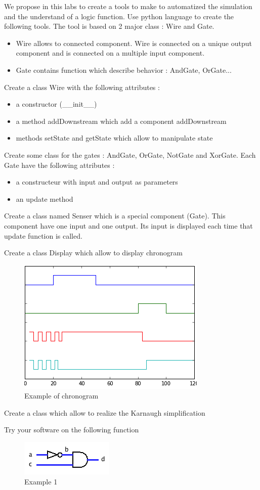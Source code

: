 \documentclass[12pt]{TDTP}
\begin{document}
\titre
We propose in this labs to create a tools to make to automatized the simulation and the understand of a logic function.
Use python language to create the following tools.
The tool is based on 2 major class : Wire and Gate.

\begin{itemize}
	\item Wire allows to connected component. Wire is connected on a unique output component and is connected on a multiple input component. 
	\item Gate contains function which describe behavior : AndGate, OrGate...
\end{itemize}

\Exo

Create a class Wire with the following attributes :

\begin{itemize}
	\item a constructor (\_\_init\_\_)
	\item a method addDownstream which add a component addDownstream
	\item methods setState and getState which allow to manipulate state
\end{itemize}


\Exo

Create some class for the gates : AndGate, OrGate, NotGate and XorGate. Each Gate have the following attributes :

\begin{itemize}
	\item a constructeur with input and output as parameters
	\item an update method
\end{itemize}
\Exo 

Create a class named Senser which is a special component (Gate).
This component have one input and one output. Its input is displayed each time that update function is called. 

\Exo

Create a class Display which allow to display chronogram

\begin{figure}[h!]
\begin{center}
\includegraphics[width=.2\textwidth]{images/chrono.png}
\caption{Example of chronogram}
\end{center}
\end{figure}

\Exo
Create a class which allow to realize the Karnaugh simplification

\Exo
Try your software on the following function

\begin{figure}[h!]
\begin{center}
\includegraphics[width=.2\textwidth]{images/ex1.png}
\caption{Example 1}
\end{center}
\end{figure}

\end{document}
